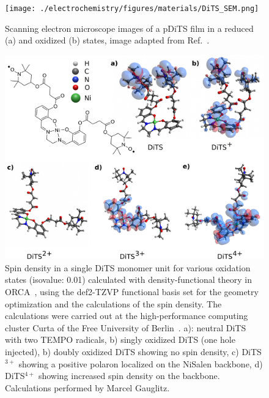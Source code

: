 \begin{figure}[!h]
\center
	\texttt{[image: ./electrochemistry/figures/materials/DiTS\_SEM.png]}
	\caption{Scanning electron microscope images of a pDiTS film in a reduced (a) and oxidized (b) states, image adapted from Ref.~\cite{Vereshchagin2020}.}
	\label{fig:Figure_1}
\end{figure}

\begin{figure}[h]
\center
	\includegraphics[width=1\textwidth]{./electrochemistry/figures/DFT_DITS.pdf}
	\caption{Spin density in a single DiTS monomer unit for various oxidation states (isovalue: 0.01) calculated with density-functional theory in ORCA~\cite{ORCA}, using the def2-TZVP functional basis set for the geometry optimization and the calculations of the spin density. The calculations were carried out at the high-performance computing cluster Curta of the Free University of Berlin~\cite{Curta}. a): neutral DiTS with two TEMPO radicals, b) singly oxidized DiTS (one hole injected), b) doubly oxidized DiTS showing no spin density, c) DiTS$^{3+}$ showing a positive polaron localized on the NiSalen backbone, d) DiTS$^{4+}$ showing increased spin density on the backbone. Calculations performed by Marcel Gauglitz.}
	\label{fig:DiTS_DFT}
\end{figure}


